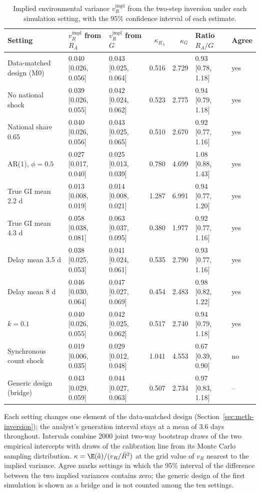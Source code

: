 \begin{table}[htbp]
\centering
\footnotesize
\setlength{\tabcolsep}{4pt}
\caption{Implied environmental variance $v_R^{\mathrm{impl}}$ from the two-step inversion under each simulation setting, with the 95\% confidence interval of each estimate.}
\label{tab:s8}
\begin{tabular}{lllrrll}
\toprule
Setting & $v_R^{\mathrm{impl}}$ from $R_A$ & $v_R^{\mathrm{impl}}$ from $G$ & $\kappa_{R_A}$ & $\kappa_G$ & Ratio $R_A/G$ & Agree \\
\midrule
Data-matched design (M0) & 0.040 [0.026, 0.056] & 0.043 [0.025, 0.064] & 0.516 & 2.729 & 0.93 [0.78, 1.18] & yes \\
No national shock & 0.039 [0.026, 0.055] & 0.042 [0.024, 0.062] & 0.523 & 2.775 & 0.94 [0.79, 1.18] & yes \\
National share 0.65 & 0.040 [0.026, 0.056] & 0.043 [0.025, 0.065] & 0.510 & 2.670 & 0.92 [0.77, 1.16] & yes \\
AR(1), $\phi=0.5$ & 0.027 [0.017, 0.040] & 0.025 [0.013, 0.039] & 0.780 & 4.699 & 1.08 [0.88, 1.43] & yes \\
True GI mean 2.2 d & 0.013 [0.008, 0.019] & 0.014 [0.008, 0.021] & 1.287 & 6.991 & 0.94 [0.77, 1.20] & yes \\
True GI mean 4.3 d & 0.058 [0.038, 0.081] & 0.063 [0.037, 0.095] & 0.380 & 1.977 & 0.92 [0.77, 1.16] & yes \\
Delay mean 3.5 d & 0.038 [0.025, 0.053] & 0.041 [0.024, 0.061] & 0.535 & 2.790 & 0.93 [0.77, 1.16] & yes \\
Delay mean 8 d & 0.046 [0.030, 0.064] & 0.047 [0.027, 0.069] & 0.454 & 2.483 & 0.98 [0.82, 1.22] & yes \\
$k=0.1$ & 0.040 [0.026, 0.055] & 0.042 [0.025, 0.062] & 0.517 & 2.740 & 0.94 [0.79, 1.18] & yes \\
Synchronous count shock & 0.019 [0.006, 0.035] & 0.029 [0.012, 0.048] & 1.041 & 4.553 & 0.67 [0.39, 0.90] & no \\
Generic design (bridge) & 0.043 [0.029, 0.059] & 0.044 [0.027, 0.063] & 0.507 & 2.734 & 0.97 [0.83, 1.18] & -- \\
\bottomrule
\end{tabular}
\par\smallskip
\begin{minipage}{0.95\linewidth}\scriptsize Each setting changes one element of the data-matched design (Section~\ref{sec:meth-inversion}); the analyst's generation interval stays at a mean of 3.6 days throughout. Intervals combine 2000 joint two-way bootstrap draws of the two empirical intercepts with draws of the calibration line from its Monte Carlo sampling distribution. $\kappa=\E(\hat{a})/(v_R/\bar{R}^2)$ at the grid value of $v_R$ nearest to the implied variance. Agree marks settings in which the 95\% interval of the difference between the two implied variances contains zero; the generic design of the first simulation is shown as a bridge and is not counted among the ten settings.\end{minipage}
\end{table}
